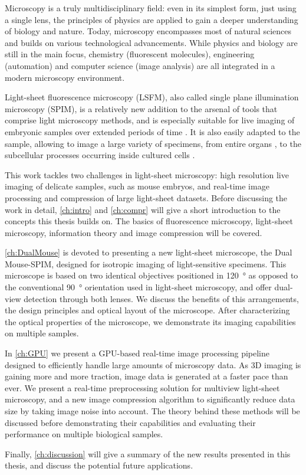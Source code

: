 Microscopy is a truly multidisciplinary field: even in its simplest form, just using a single lens, the principles of physics are applied to gain a deeper understanding of biology and nature. Today, microscopy encompasses most of natural sciences and builds on various technological advancements. While physics and biology are still in the main focus, chemistry (fluorescent molecules), engineering (automation) and computer science (image analysis) are all integrated in a modern microscopy environment.

Light-sheet fluorescence microscopy (LSFM), also called single plane illumination microscopy (SPIM), is a relatively new addition to the arsenal of tools that comprise light microscopy methods, and is especially suitable for live imaging of embryonic samples over extended periods of time \cite{keller_quantitative_2008, huisken_selective_2009, weber_light_2011,tomer_shedding_2011}. It is also easily adapted to the sample, allowing to image a large variety of specimens, from entire organs \cite{dodt_ultramicroscopy:_2007}, to the subcellular processes occurring inside cultured cells \cite{chen_lattice_2014}.

This work tackles two challenges in light-sheet microscopy: high resolution live imaging of delicate samples, such as mouse embryos, and real-time image processing and compression of large light-sheet datasets. Before discussing the work in detail, \autoref{ch:intro} and \autoref{ch:compr} will give a short introduction to the concepts this thesis builds on. The basics of fluorescence microscopy, light-sheet microscopy, information theory and image compression will be covered.

\autoref{ch:DualMouse} is devoted to presenting a new light-sheet microscope, the Dual Mouse-SPIM, designed for isotropic imaging of light-sensitive specimens. This microscope is based on two identical objectives positioned in \SI{120}{\degree} as opposed to the conventional \SI{90}{\degree} orientation used in light-sheet microscopy, and offer dual-view detection through both lenses. We discuss the benefits of this arrangements, the design principles and optical layout of the microscope. After characterizing the optical properties of the microscope, we demonstrate its imaging capabilities on multiple samples.

In \autoref{ch:GPU} we present a GPU-based real-time image processing pipeline designed to efficiently handle large amounts of microscopy data. As 3D imaging is gaining more and more traction, image data is generated at a faster pace than ever. We present a real-time preprocessing solution for multiview light-sheet microscopy, and a new image compression algorithm to significantly reduce data size by taking image noise into account. The theory behind these methods will be discussed before demonstrating their capabilities and evaluating their performance on multiple biological samples.

Finally, \autoref{ch:discussion} will give a summary of the new results presented in this thesis, and discuss the potential future applications.